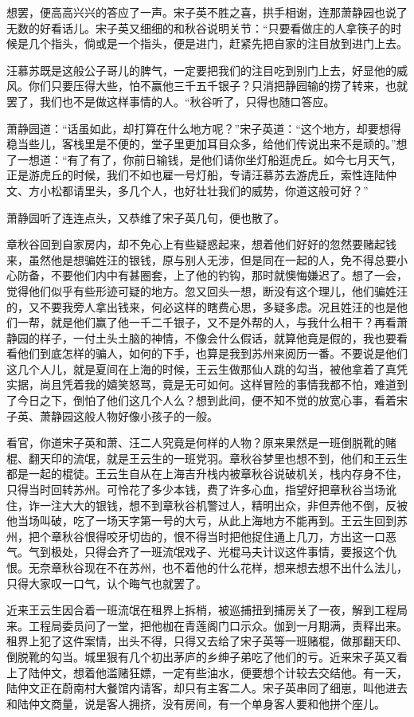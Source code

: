\documentclass[12pt,UTF8]{ctexbook}
\begin{document}
{{{想罢，便高高兴兴的答应了一声。宋子英不胜之喜，拱手相谢，连那萧静园也说了无数的好看话儿。宋子英又细细的和秋谷说明关节：“只要看做庄的人拿筷子的时候是几个指头，倘或是一个指头，便是进门，赶紧先把自家的注目放到进门上去。

汪慕苏既是这般公子哥儿的脾气，一定要把我们的注目吃到别门上去，好显他的威风。你们只要压得大些，怕不赢他三千五千银子？只消把静园输的捞了转来，也就罢了，我们也不是做这样事情的人。“秋谷听了，只得也随口答应。

萧静园道：“话虽如此，却打算在什么地方呢？”宋子英道：“这个地方，却要想得稳当些儿，客栈里是不便的，堂子里更加耳目众多，给他们传说出来不是顽的。”想了一想道：“有了有了，你前日输钱，是他们请你坐灯船逛虎丘。如今七月天气，正是游虎丘的时候，我们不如也雇一号灯船，专请汪慕苏去游虎丘，索性连陆仲文、方小松都请里头，多几个人，也好壮壮我们的威势，你道这般可好？”

萧静园听了连连点头，又恭维了宋子英几句，便也散了。

章秋谷回到自家房内，却不免心上有些疑惑起来，想着他们好好的忽然要赌起钱来，虽然他是想骗姓汪的银钱，原与别人无涉，但是同在一起的人，免不得总要小心防备，不要他们内中有甚圈套，上了他的钓钩，那时就懊悔嫌迟了。想了一会，觉得他们似乎有些形迹可疑的地方。忽又回头一想，断没有这个理儿，他们骗姓汪的，又不要我旁人拿出钱来，何必这样的瞎费心思，多疑多虑。况且姓汪的也是他们一帮，就是他们赢了他一千二千银子，又不是外帮的人，与我什么相干？再看萧静园的样子，一付土头土脑的神情，不像会什么假话，就算他竟是假的，我也要看看他们到底怎样的骗人，如何的下手，也算是我到苏州来阅历一番。不要说是他们这几个人儿，就是夏间在上海的时候，王云生做那仙人跳的勾当，被他拿着了真凭实据，尚且凭着我的嬉笑怒骂，竟是无可如何。这样冒险的事情我都不怕，难道到了今日之下，倒怕了他们这几个人么？想到此间，便不知不觉的放宽心事，看着宋子英、萧静园这般人物好像小孩子的一般。

看官，你道宋子英和萧、汪二人究竟是何样的人物？原来果然是一班倒脱靴的赌棍、翻天印的流氓，就是王云生的一班党羽。章秋谷梦里也想不到，他们和王云生都是一起的棍徒。王云生自从在上海吉升栈内被章秋谷说破机关，栈内存身不住，只得当时回转苏州。可怜花了多少本钱，费了许多心血，指望好把章秋谷当场讹住，诈一注大大的银钱，想不到章秋谷机警过人，精明出众，非但弄他不倒，反被他当场叫破，吃了一场天字第一号的大亏，从此上海地方不能再到。王云生回到苏州，把个章秋谷恨得咬牙切齿的，恨不得当时把他捉住通上几刀，方出这一口恶气。气到极处，只得会齐了一班流氓戏子、光棍马夫计议这件事情，要报这个仇恨。无奈章秋谷现在不在苏州，也不着他的什么花样，想来想去想不出什么法儿，只得大家叹一口气，认个晦气也就罢了。

近来王云生因合着一班流氓在租界上拆梢，被巡捕扭到捕房关了一夜，解到工程局来。工程局委员问了一堂，把他枷在青莲阁门口示众。伽到一月期满，责释出来。租界上犯了这件案情，出头不得，只得又去给了宋子英等一班赌棍，做那翻天印、倒脱靴的勾当。城里狠有几个初出茅庐的乡绅子弟吃了他们的亏。近来宋子英又看上了陆仲文，想着他滥赌狂嫖，一定有些油水，便要想个计较去交结他。有一天，陆仲文正在蔚南村大餐馆内请客，却只有主客二人。宋子英串同了细崽，叫他进去和陆仲文商量，说是客人拥挤，没有房间，有一个单身客人要和他拼个座儿。

}}}
\end{document}
